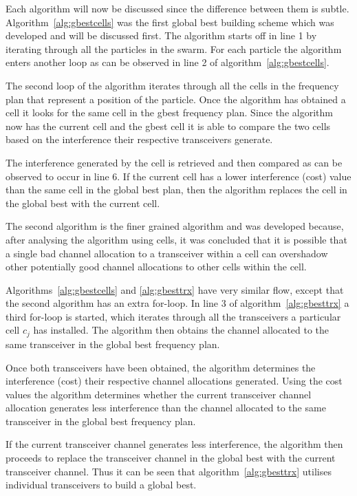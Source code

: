 Each algorithm will now be discussed since the difference between them is subtle. Algorithm~\ref{alg:gbestcells} was the first global best building scheme which was developed and will be discussed first. The algorithm starts off in line 1 by iterating through all the particles in the swarm. For each particle the algorithm enters another loop as can be observed in line 2 of algorithm~\ref{alg:gbestcells}.

The second loop of the algorithm iterates through all the cells in the frequency plan that represent a position of the particle. Once the algorithm has obtained a cell it looks for the same cell in the gbest frequency plan. Since the algorithm now has the current cell and the gbest cell it is able to compare the two cells based on the interference their respective transceivers generate.

The interference generated by the cell is retrieved and then compared as can be observed to occur in line 6. If the current cell has a lower interference (cost) value than the same cell in the global best plan, then the algorithm replaces the cell in the global best with the current cell.

The second algorithm is the finer grained algorithm and was developed because, after analysing the algorithm using cells, it was concluded that it is possible that a single bad channel allocation to a transceiver within a cell can overshadow other potentially good channel allocations to other cells within the cell.

Algorithms~\ref{alg:gbestcells} and \ref{alg:gbesttrx} have very similar flow, except that the second algorithm has an extra for-loop. In line 3 of algorithm~\ref{alg:gbesttrx} a third for-loop is started, which iterates through all the transceivers a particular cell $c_j$ has installed. The algorithm then obtains the channel allocated to the same transceiver in the global best frequency plan.

Once both transceivers have been obtained, the algorithm determines the interference (cost) their respective channel allocations generated. Using the cost values the algorithm determines whether the current transceiver channel allocation generates less interference than the channel allocated to the same transceiver in the global best frequency plan.

If the current transceiver channel generates less interference, the algorithm then proceeds to replace the transceiver channel in the global best with the current transceiver channel. Thus it can be seen that algorithm~\ref{alg:gbesttrx} utilises individual transceivers to build a global best.


